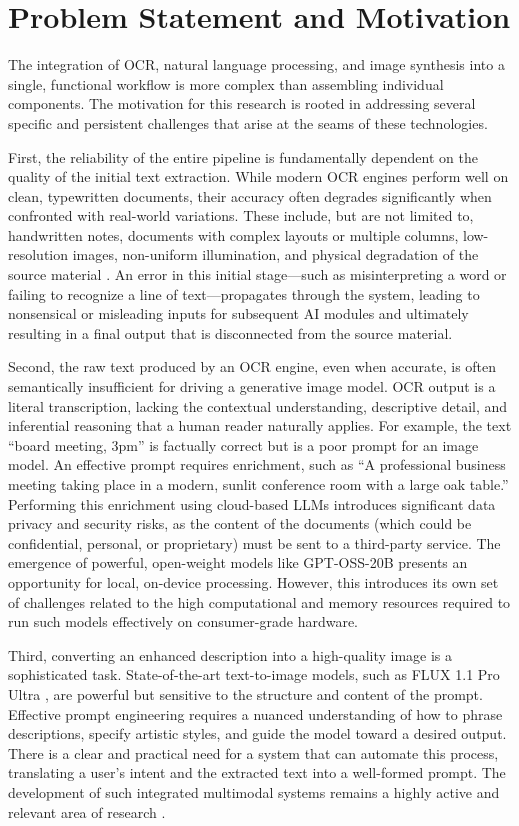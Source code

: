 \section{Problem Statement and Motivation}
The integration of OCR, natural language processing, and image synthesis into a single, functional workflow is more complex than assembling individual components. The motivation for this research is rooted in addressing several specific and persistent challenges that arise at the seams of these technologies.

First, the reliability of the entire pipeline is fundamentally dependent on the quality of the initial text extraction. While modern OCR engines perform well on clean, typewritten documents, their accuracy often degrades significantly when confronted with real-world variations. These include, but are not limited to, handwritten notes, documents with complex layouts or multiple columns, low-resolution images, non-uniform illumination, and physical degradation of the source material \cite{esser2020improving}. An error in this initial stage—such as misinterpreting a word or failing to recognize a line of text—propagates through the system, leading to nonsensical or misleading inputs for subsequent AI modules and ultimately resulting in a final output that is disconnected from the source material.

Second, the raw text produced by an OCR engine, even when accurate, is often semantically insufficient for driving a generative image model. OCR output is a literal transcription, lacking the contextual understanding, descriptive detail, and inferential reasoning that a human reader naturally applies. For example, the text “board meeting, 3pm” is factually correct but is a poor prompt for an image model. An effective prompt requires enrichment, such as “A professional business meeting taking place in a modern, sunlit conference room with a large oak table.” Performing this enrichment using cloud-based LLMs introduces significant data privacy and security risks, as the content of the documents (which could be confidential, personal, or proprietary) must be sent to a third-party service. The emergence of powerful, open-weight models like GPT-OSS-20B \cite{openai2025gptoss} presents an opportunity for local, on-device processing. However, this introduces its own set of challenges related to the high computational and memory resources required to run such models effectively on consumer-grade hardware.

Third, converting an enhanced description into a high-quality image is a sophisticated task. State-of-the-art text-to-image models, such as FLUX 1.1 Pro Ultra \cite{blackforestlabs2024flux}, are powerful but sensitive to the structure and content of the prompt. Effective prompt engineering requires a nuanced understanding of how to phrase descriptions, specify artistic styles, and guide the model toward a desired output. There is a clear and practical need for a system that can automate this process, translating a user's intent and the extracted text into a well-formed prompt. The development of such integrated multimodal systems remains a highly active and relevant area of research \cite{qin2024comprehensive, jin2024mm}.

